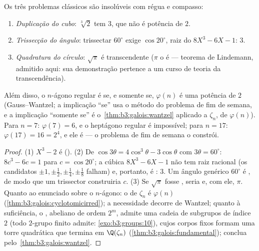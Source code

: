 \begin{corollary}\label{cor:b3:galois:impossible}
Os três problemas clássicos são insolúveis com régua e
compasso:
\begin{enumerate}
  \item \emph{Duplicação do cubo}: $\sqrt[3]2$ tem  $3$, que não é
        potência de $2$.
  \item \emph{Trissecção do ângulo}: trissectar $60^\circ$ exige $\cos 20^\circ$, raiz
        do  $8X^3
        - 6X - 1$:  $3$.
  \item \emph{Quadratura do círculo}: $\sqrt\pi$ é transcendente ($\pi$
        o é --- teorema de Lindemann, admitido aqui: sua demonstração
        pertence a um curso de teoria da transcendência).
\end{enumerate}
Além disso, o $n$-ágono regular é  se, e somente se,
$\varphi(n)$ é uma potência de $2$ (Gauss--Wantzel; a implicação ``se''
usa o método do problema de fim de semana, e a implicação ``somente
se'' é o~\cref{thm:b3:galois:wantzel} aplicado a $\zeta_n$, de  $\varphi(n)$). Para
$n = 7$: $\varphi(7) = 6$, e o heptágono regular é impossível; para
$n = 17$: $\varphi(17) = 16 = 2^4$, e ele é  --- o problema de fim de
semana o constrói.
\end{corollary}

\begin{proof}
(1) $X^3 - 2$ é  (). (2) De $\cos
3\theta = 4\cos^3\theta - 3\cos\theta$ com $3\theta =
60^\circ$: $8c^3 - 6c = 1$ para
$c = \cos 20^\circ$; a cúbica $8X^3 - 6X - 1$ não tem raiz racional (os candidatos $\pm1, \pm\frac
12, \pm\frac14, \pm\frac18$
falham) e, portanto, é :  $3$. Um ângulo genérico
$60^\circ$ é , de modo que um trissector construiria $c$.
(3) Se $\sqrt\pi$ fosse , seria  e, com ele, $\pi$.
Quanto ao enunciado sobre o $n$-ágono: o  de $\zeta_n$ é $\varphi(n)$
(\cref{thm:b3:galois:cyclotomicirred}); a necessidade decorre de Wantzel; quanto à
suficiência, o , abeliano de ordem $2^m$, admite uma
cadeia de subgrupos de índice $2$ (todo $2$-grupo finito admite:
\cref{exo:b3:groups:10}), cujos corpos fixos formam uma torre quadrática que
termina em $\Q(\zeta_n)$ (\cref{thm:b3:galois:fundamental}); conclua pelo~\cref{thm:b3:galois:wantzel}.
\end{proof}

